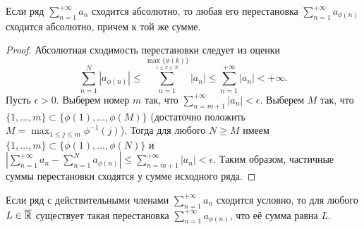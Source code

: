 \begin{theorem}
    \label{convergence-9}
    Если ряд $\sum_{n = 1}^{+\infty} a_{n}$ сходится абсолютно, то любая его перестановка $\sum_{n = 1}^{+\infty} a_{\phi(n)}$ сходится абсолютно, причем к той же сумме.
\end{theorem}

\begin{proof}
    Абсолютная сходимость перестановки следует из оценки
    \[\sum_{n = 1}^{N}|a_{\phi(n)}| \leq \sum_{n = 1}^{\underset{1 \leq k \leq N}{\max\{\phi(k)\}}} |a_{n}| \leq \sum_{n = 1}^{+\infty}|a_{n}| < +\infty.\]
    Пусть $\epsilon > 0$. Выберем номер $m$ так, что $\sum_{n = m + 1}^{+\infty}|a_{n}| < \epsilon$. Выберем $M$ так, что $\{1, \ldots, m\} \subset \{\phi(1), \ldots, \phi(M)\}$ (достаточно положить $M = \max_{1 \leq j \leq m}\phi^{-1}(j)$). Тогда для любого $N \geq M$ имеем $\{1, \ldots, m\} \subset \{\phi(1), \ldots, \phi(N)\}$ и $\left|\sum_{n = 1}^{+\infty}a_{n} - \sum_{n = 1}^{N} a_{\phi(n)}\right| \leq \sum_{n = m + 1}^{+\infty}|a_{n}| < \epsilon$.
    Таким образом, частичные суммы перестановки сходятся у сумме исходного ряда.
\end{proof}

\begin{problem}
    Если ряд с действительными членами $\sum_{n = 1}^{+\infty} a_{n}$ сходится условно, то для любого $L \in \overline{\mathbb{R}}$ существует такая перестановка $\sum_{n = 1}^{+\infty} a_{\phi(n)}$, что её сумма равна $L$.
\end{problem}